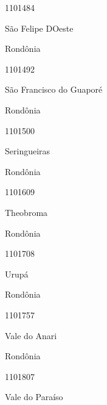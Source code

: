 \documentclass[
  letterpaper,
]{report}
\begin{document}
\n      

1101484

\n      

São Felipe D\textquotesingle Oeste

\n    

\n    

\n      

Rondônia

\n      

1101492

\n      

São Francisco do Guaporé

\n    

\n    

\n      

Rondônia

\n      

1101500

\n      

Seringueiras

\n    

\n    

\n      

Rondônia

\n      

1101609

\n      

Theobroma

\n    

\n    

\n      

Rondônia

\n      

1101708

\n      

Urupá

\n    

\n    

\n      

Rondônia

\n      

1101757

\n      

Vale do Anari

\n    

\n    

\n      

Rondônia

\n      

1101807

\n      

Vale do Paraíso
\end{document}
